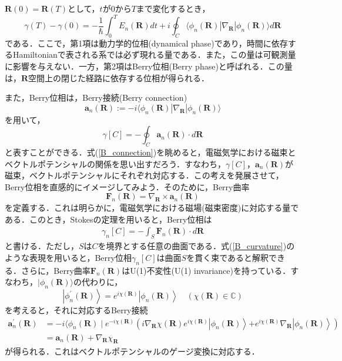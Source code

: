 \documentclass[a4paper, titlepage]{jsreport}
\begin{document}
$\bm{R}(0) = \bm{R}(T)$として，$t$が$0$から$T$まで変化するとき，
\begin{equation}
  \gamma(T) - \gamma(0) = -\frac{1}{\hbar} \int_0^T E_n(\bm{R}) dt + i \oint_C \langle \phi_n(\bm{R}) | \nabla_{\bm{R}} | \phi_n(\bm{R}) \rangle d\bm{R}
\end{equation}
である．ここで，第1項は動力学的位相(dynamical phase)であり，時間に依存するHamiltonianで表される系では必ず現れる量である．また，この量は可観測量に影響を与えない．一方，第2項はBerry位相(Berry phase)と呼ばれる．この量は，$\bm{R}$空間上の閉じた経路に依存する位相が得られる．


また，Berry位相は，Berry接続(Berry connection)
\begin{equation}
  \bm{a}_n(\bm{R}) := -i \langle \phi_n(\bm{R}) | \nabla_{\bm{R}} | \phi_n(\bm{R}) \rangle
\end{equation}
を用いて，
\begin{equation}
  \gamma[C] = - \oint_C \bm{a}_n(\bm{R}) \cdot d\bm{R} \label{B_connection}
\end{equation}
と表すことができる．式(\ref{B_connection})を眺めると，電磁気学における磁束とベクトルポテンシャルの関係を思い出すだろう．すなわち，$\gamma[C]$，$\bm{a}_n(\bm{R})$が磁束，ベクトルポテンシャルにそれぞれ対応する．この考えを発展させて，Berry位相を直感的にイメージしてみよう．そのために，Berry曲率
\begin{equation}
  \bm{F}_n(\bm{R}) = \nabla_{\bm{R}} \times \bm{a}_n(\bm{R})
\end{equation}
を定義する．これは明らかに，電磁気学における磁場(磁束密度)に対応する量である．このとき，Stokesの定理を用いると，Berry位相は
\begin{align}
  \gamma_n[C] = - \int_S \bm{F}_n(\bm{R}) \cdot d\bm{R} \label{B_curvature}
\end{align}
と書ける．ただし，$S$は$C$を境界とする任意の曲面である．式(\ref{B_curvature})のような表現を用いると，Berry位相$\gamma_n[C]$は曲面$S$を貫く束であると解釈できる．さらに，Berry曲率$\bm{F}_n(\bm{R})$はU(1)不変性(U(1) invariance)を持っている．すなわち，$|\phi_n(\bm{R}) \rangle$の代わりに，
\begin{equation}
  \left|\phi_n^{\prime}(\bm{R})\right\rangle=e^{i \chi(\bm{R})}\left|\phi_n(\bm{R})\right\rangle \quad (\chi(\bm{R}) \in \mathbb{C})
\end{equation}
を考えると，それに対応するBerry接続
\begin{align}
  \bm{a}_n^{\prime}(\bm{R})
  &= -i\langle \phi_n(\bm{R}) \mid e^{-i\chi(\bm{R})}\left(i \nabla_{\bm{R}} \chi(\bm{R}) e^{i \chi(\bm{R})}\left|\phi_n(\bm{R})\right\rangle\right. \left.+e^{i \chi(\bm{R})} \nabla_{\bm{R}}\left|\phi_n(\bm{R})\right\rangle\right)\\
  &= \bm{a}_n(\bm{R})+  \nabla_{\bm{R}} \chi_{\bm{R}}
\end{align}
が得られる．これはベクトルポテンシャルのゲージ変換に対応する．
\end{document}
